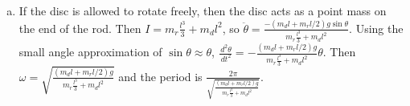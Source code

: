 \documentclass{esg8012pset}
\renewcommand{\d}{\,d}
\begin{document}
\begin{solution}
\begin{enumerate}[(a)]
\begin{proof}
\begin{align*}
        & = \vec \omega \left( d^2 m_T +  I_{\ell_1} + 2\vec d \cdot \vec 0 \right) \\
        & = \vec \omega \left( d^2 m_T +  I_{\ell_1} \right) \\
        \\
        I_{\ell_2} & = I_{\ell_1} + d^2 m_T
      \end{align*}
    \end{proof}
    $\alpha = \ddot\theta = \frac{\d L / \d t}{I}$.  \begin{align*}
    I & = m_r\int_0^l r^2 \d r + m_d l^2 + \int_0^R \frac{m_d 2 \pi r}{\pi R^2} r^2 \d r \\
      & = m_r\frac{l^3}{3} + m_d l^2 + \frac{m_d 2}{R^2}\int_0^R r^3 \d r \\
      & = m_r\frac{l^3}{3} + m_d l^2 + \frac{m_d 2 R^4}{4 R^2} \\
      & = m_r\frac{l^3}{3} + m_d l^2 + \frac{m_d R^2}{2}
    \end{align*} Then $\ddot \theta = \frac{-(m_d l + m_r l / 2)g\sin\theta}{m_r\frac{l^3}{3} + m_d l^2 + \frac{m_d R^2}{2}}$.  Using the small angle approximation of $\sin\theta\approx \theta$, $\frac{\d^2 \theta}{\d t^2} = -\frac{(m_d l + m_r l / 2)g}{m_r\frac{l^3}{3} + m_d l^2 + \frac{m_d R^2}{2}}\theta$.  Then $\omega = \sqrt{\frac{(m_d l + m_r l / 2)g}{m_r\frac{l^3}{3} + m_d l^2 + \frac{m_d R^2}{2}}}$ and the period is $\frac{2\pi}{\sqrt{\frac{(m_d l + m_r l / 2)g}{m_r\frac{l^3}{3} + m_d l^2 + \frac{m_d R^2}{2}}}}$.
    \item If the disc is allowed to rotate freely, then the disc acts as a point mass on the end of the rod.  Then $I = m_r\frac{l^3}{3} + m_d l^2$, so $\ddot \theta = \frac{-(m_d l + m_r l / 2)g\sin\theta}{m_r\frac{l^3}{3} + m_d l^2}$.  Using the small angle approximation of $\sin\theta\approx \theta$, $\frac{\d^2 \theta}{\d t^2} = -\frac{(m_d l + m_r l / 2)g}{m_r\frac{l^3}{3} + m_d l^2}\theta$.  Then $\omega = \sqrt{\frac{(m_d l + m_r l / 2)g}{m_r\frac{l^3}{3} + m_d l^2}}$ and the period is $\frac{2\pi}{\sqrt{\frac{(m_d l + m_r l / 2)g}{m_r\frac{l^3}{3} + m_d l^2}}}$.
  \end{enumerate}
\end{solution}
\end{document}
